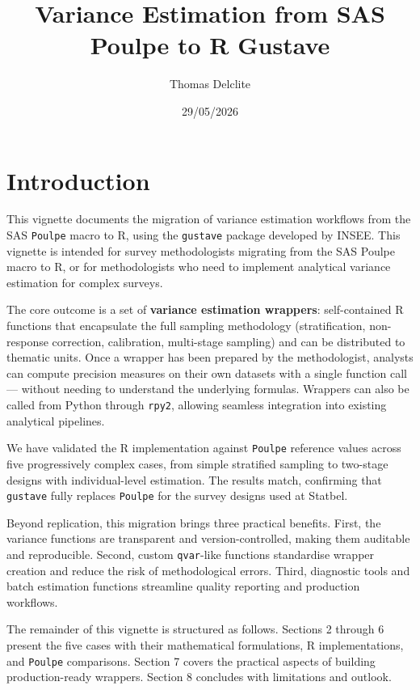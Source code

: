 \documentclass[
]{article}
\title{Variance Estimation from SAS Poulpe to R Gustave}
\author{Thomas Delclite}
\date{29/05/2026}
\begin{document}
\maketitle

{
\setcounter{tocdepth}{2}
\tableofcontents
}
\section{Introduction}\label{introduction}

This vignette documents the migration of variance estimation workflows
from the SAS \texttt{Poulpe} macro to R, using the \texttt{gustave}
package developed by INSEE. This vignette is intended for survey
methodologists migrating from the SAS Poulpe macro to R, or for
methodologists who need to implement analytical variance estimation for
complex surveys.

The core outcome is a set of \textbf{variance estimation wrappers}:
self-contained R functions that encapsulate the full sampling
methodology (stratification, non-response correction, calibration,
multi-stage sampling) and can be distributed to thematic units. Once a
wrapper has been prepared by the methodologist, analysts can compute
precision measures on their own datasets with a single function call ---
without needing to understand the underlying formulas. Wrappers can also
be called from Python through \texttt{rpy2}, allowing seamless
integration into existing analytical pipelines.

We have validated the R implementation against \texttt{Poulpe} reference
values across five progressively complex cases, from simple stratified
sampling to two-stage designs with individual-level estimation. The
results match, confirming that \texttt{gustave} fully replaces
\texttt{Poulpe} for the survey designs used at Statbel.

Beyond replication, this migration brings three practical benefits.
First, the variance functions are transparent and version-controlled,
making them auditable and reproducible. Second, custom
\texttt{qvar}-like functions standardise wrapper creation and reduce the
risk of methodological errors. Third, diagnostic tools and batch
estimation functions streamline quality reporting and production
workflows.

The remainder of this vignette is structured as follows. Sections 2
through 6 present the five cases with their mathematical formulations, R
implementations, and \texttt{Poulpe} comparisons. Section 7 covers the
practical aspects of building production-ready wrappers. Section 8
concludes with limitations and outlook.
\end{document}

